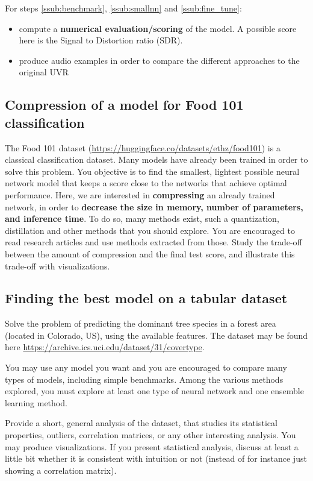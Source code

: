 \documentclass[
10pt, %
a4paper, %
oneside, %
headinclude,footinclude, %
BCOR5mm, %
]{scrartcl}
\begin{document}
For steps \ref{ssub:benchmark}, \ref{ssub:smallnn} and \ref{ssub:fine_tune}:
\begin{itemize}
    \item compute a \textbf{numerical evaluation/scoring} of the model. A possible score here is the Signal to Distortion ratio (SDR).
    \item produce audio examples in order to compare the different approaches to the original UVR
\end{itemize}

\subsection{Compression of a model for Food 101 classification}%
\label{sub:food101}

The Food 101 dataset (\url{https://huggingface.co/datasets/ethz/food101}) is a classical classification dataset. Many models have already been trained in order to solve this problem. You objective is to find the smallest, lightest possible neural network model that keeps a score close to the networks that achieve optimal performance. Here, we are interested in \textbf{compressing} an already trained network, in order to \textbf{decrease the size in memory, number of parameters, and inference time}. To do so, many methods exist, such a quantization, distillation and other methods that you should explore. You are encouraged to read research articles and use methods extracted from those. Study the trade-off between the amount of compression and the final test score, and illustrate this trade-off with visualizations.

\subsection{Finding the best model on a tabular dataset}%
\label{sub:tabular}

Solve the problem of predicting the dominant tree species in a forest area (located in Colorado, US), using the available features. The dataset may be found here \url{https://archive.ics.uci.edu/dataset/31/covertype}.

You may use any model you want and you are encouraged to compare many types of models, including simple benchmarks. Among the various methods explored, you must explore at least one type of neural network and one ensemble learning method.

Provide a short, general analysis of the dataset, that studies its statistical properties, outliers, correlation matrices, or any other interesting analysis. You may produce visualizations. If you present statistical analysis, discuss at least a little bit whether it is consistent with intuition or not (instead of for instance just showing a correlation matrix).
\end{document}
